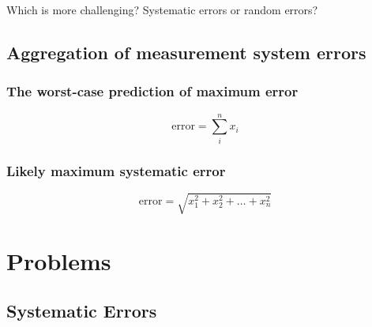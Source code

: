 \documentclass[a4paper,11pt]{book}
\begin{document}
\begin{question}
Which is more challenging? Systematic errors or random errors?
\end{question}
\begin{solution}


\end{solution}


\section*{Aggregation of measurement system errors}

\subsection*{The worst-case prediction of maximum error}

\begin{equation}
\text{error} = \sum_{i}^{n} x_i
\end{equation}

\subsection*{Likely maximum systematic error}

\begin{equation}
\text{error} = \sqrt{ x_{1}^{2} + x_{2}^{2} + \ldots + x_{n}^{2} }
\end{equation}

\chapter*{Problems}

\section*{Systematic Errors}
\end{document}
